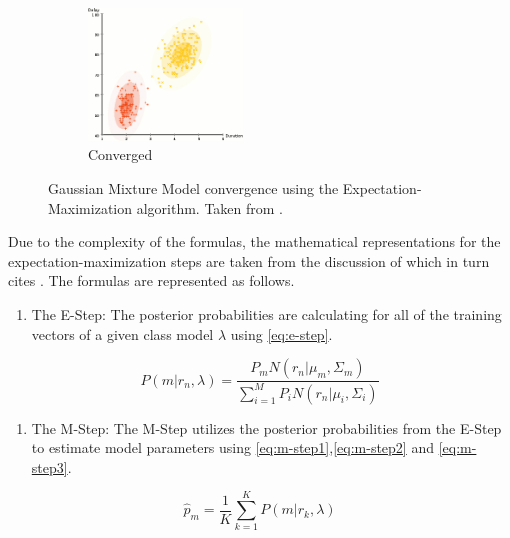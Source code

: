\documentclass
[
    a4paper,
    twoside,
    12pt,
]
{report}
\begin{document}
\begin{figure}[]
   \begin{subfigure}[b]{\textwidth}
      \centering
      \includegraphics[width=0.45\textwidth]{img/em-alg4.jpg}
         \caption{Converged}
         \label{fig:gmm-conv}
   \end{subfigure}
   \quad
   \caption{Gaussian Mixture Model convergence using the Expectation-Maximization algorithm. Taken from \textcite{mcgonagle2016}.}
   \label{fig:em-converge}
\end{figure}

Due to the complexity of the formulas, the mathematical representations
for the expectation-maximization steps are taken from the discussion of
\textcite{demarco2015} which in turn cites \textcite{rose1990}. The
formulas are represented as follows.

\begin{enumerate}
\def\labelenumi{\arabic{enumi}.}
\tightlist
\item
  The E-Step: The posterior probabilities are calculating for all of the
  training vectors of a given class model \(\lambda\) using
  \autoref{eq:e-step}.
\end{enumerate}

\begin{equation}
\label{eq:e-step}
P(m|r_n,\lambda) = \frac{P_mN(r_n|\mu_m,\Sigma_m)}{\sum_{i=1}^MP_iN(r_n|\mu_i,\Sigma_i)}
\end{equation}

\begin{enumerate}
\def\labelenumi{\arabic{enumi}.}
\setcounter{enumi}{1}
\tightlist
\item
  The M-Step: The M-Step utilizes the posterior probabilities from the
  E-Step to estimate model parameters using
  \autoref{eq:m-step1},\autoref{eq:m-step2} and \autoref{eq:m-step3}.
\end{enumerate}

\begin{equation}
\label{eq:m-step1}
\hat{p}_m = \frac{1}{K}\sum_{k=1}^{K}P(m|r_k,\lambda)
\end{equation}
\end{document}
